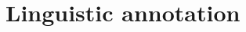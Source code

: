\documentclass[handout]{beamer}
\renewcommand{\code}[1]{{\small \texttt{\red{#1}}}}
\begin{document}


\section{Linguistic annotation}
\end{document}
